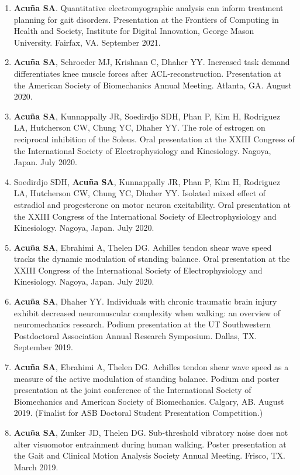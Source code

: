 \documentclass[letterpaper, 10pt]{article}
\begin{document}
\begin{enumerate}
    \item \textbf{Acuña SA}. Quantitative electromyographic analysis can inform treatment planning for gait disorders. Presentation at the Frontiers of Computing in Health and Society, Institute for Digital Innovation, George Mason University. Fairfax, VA. September 2021.
    \item \textbf{Acuña SA}, Schroeder MJ, Krishnan C, Dhaher YY. Increased task demand differentiates knee muscle forces after ACL-reconstruction. Presentation at the American Society of Biomechanics Annual Meeting. Atlanta, GA. August 2020.
    \item \textbf{Acuña SA}, Kunnappally JR, Soedirdjo SDH, Phan P, Kim H, Rodriguez LA, Hutcherson CW, Chung YC, Dhaher YY. The role of estrogen on reciprocal inhibition of the Soleus. Oral presentation at the XXIII Congress of the International Society of Electrophysiology and Kinesiology. Nagoya, Japan. July 2020.
    \item Soedirdjo SDH, \textbf{Acuña SA}, Kunnappally JR, Phan P, Kim H, Rodriguez LA, Hutcherson CW, Chung YC, Dhaher YY. Isolated mixed effect of estradiol and progesterone on motor neuron excitability. Oral presentation at the XXIII Congress of the International Society of Electrophysiology and Kinesiology. Nagoya, Japan. July 2020.
    \item \textbf{Acuña SA}, Ebrahimi A, Thelen DG. Achilles tendon shear wave speed tracks the dynamic modulation of standing balance. Oral presentation at the XXIII Congress of the International Society of Electrophysiology and Kinesiology. Nagoya, Japan. July 2020.
    \item \textbf{Acuña SA}, Dhaher YY. Individuals with chronic traumatic brain injury exhibit decreased neuromuscular complexity when walking: an overview of neuromechanics research. Podium presentation at the UT Southwestern Postdoctoral Association Annual Research Symposium. Dallas, TX. September 2019.
    \item \textbf{Acuña SA}, Ebrahimi A, Thelen DG. Achilles tendon shear wave speed as a measure of the active modulation of standing balance. Podium and poster presentation at the joint conference of the International Society of Biomechanics and American Society of Biomechanics. Calgary, AB. August 2019. (Finalist for ASB Doctoral Student Presentation Competition.)
    \item \textbf{Acuña SA}, Zunker JD, Thelen DG. Sub-threshold vibratory noise does not alter visuomotor entrainment during human walking. Poster presentation at the Gait and Clinical Motion Analysis Society Annual Meeting. Frisco, TX. March 2019.

\end{enumerate}
\end{document}
